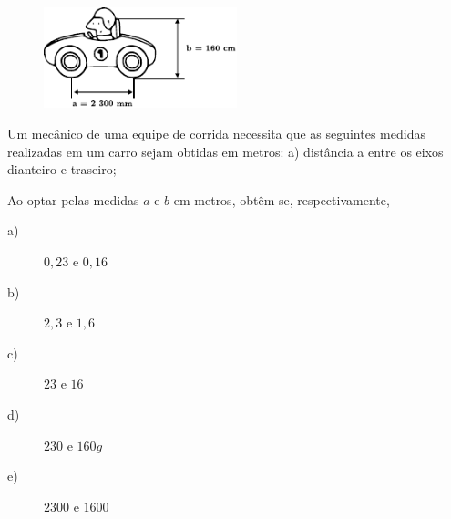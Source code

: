 \newpage
\begin{figure}[!h]
    \centering
    \includegraphics[width=0.5\textwidth]{imagens/matematicaBasica/sistemaDeUnidades/carro.pdf}
\end{figure}
\begin{exercise}[ENEM 2011]
Um mecânico de uma equipe de corrida necessita que as seguintes medidas realizadas em um carro sejam obtidas em metros: a) distância a entre os eixos dianteiro e traseiro;

Ao optar pelas medidas $a$ e $b$ em metros, obtêm-se, respectivamente,

    \begin{description}
        \item[a)] $0,23 \textrm{ e } 0,16$
        \item[b)] $2,3 \textrm{ e } 1,6$
        \item[c)] $23 \textrm{ e } 16$
        \item[d)] $230 \textrm{ e } 160g$
        \item[e)] $2300 \textrm{ e } 1600$
    \end{description}

\end{exercise}

